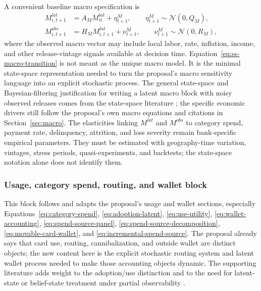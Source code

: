 \documentclass[11pt]{article}
\newcommand{\1}{\mathbf{1}}
\begin{document}
A convenient baseline macro specification is
\begin{align}
  M^{lat}_{i,t+1}
    &= A_M M^{lat}_{it} + \eta^{M}_{t+1},
       \qquad \eta^{M}_{t+1}\sim\mathcal{N}(0,Q_M),
       \label{eq:ss-macro-transition}\\
  M^{obs}_{i,t+1}
    &= H_M M^{lat}_{i,t+1} + \nu^{M}_{t+1},
       \qquad \nu^{M}_{t+1}\sim\mathcal{N}(0,R_M),
       \label{eq:ss-macro-observation}
\end{align}
where the observed macro vector may include local labor, rate, inflation,
income, and other release-vintage signals available at decision time.
Equation~\eqref{eq:ss-macro-transition} is not meant as the unique macro model.
It is the minimal state-space representation needed to turn the proposal's macro
sensitivity language into an explicit stochastic process. The general state-space
and Bayesian-filtering justification for writing a latent macro block with noisy
observed releases comes from the state-space literature
\citep{durbinkoopman2012ssm,westharrison1997bfdm}; the specific economic drivers
still follow the proposal's own macro equations and citations in
Section~\ref{sec:macro}.
The elasticities linking $M^{lat}$ and $M^{obs}$ to category spend, payment
rate, delinquency, attrition, and loss severity remain bank-specific empirical
parameters. They must be estimated with geography-time variation, vintages,
stress periods, quasi-experiments, and backtests; the state-space notation
alone does not identify them.

\subsubsection{Usage, category spend, routing, and wallet block}
\label{subsec:state-space-usage-wallet}

This block follows and adapts the proposal's usage and wallet sections,
especially Equations~\eqref{eq:category-spend},
\eqref{eq:adoption-latent}, \eqref{eq:use-utility},
\eqref{eq:wallet-accounting}, \eqref{eq:spend-source-panel},
\eqref{eq:spend-source-decomposition}, \eqref{eq:movable-card-wallet}, and
\eqref{eq:incremental-spend-source}. The proposal already says that card use,
routing, cannibalization, and outside wallet are distinct objects; the new
content here is the explicit stochastic routing system and latent wallet process
needed to make those accounting objects dynamic. The supporting literature adds
weight to the adoption/use distinction and to the need for latent-state or
belief-state treatment under partial observability
\citep{koulayev2012payment,agarwal2010rewards,prelec2001creditcard,
smallwood1973pomdp,kaelbling1998pomdp}.
\end{document}
